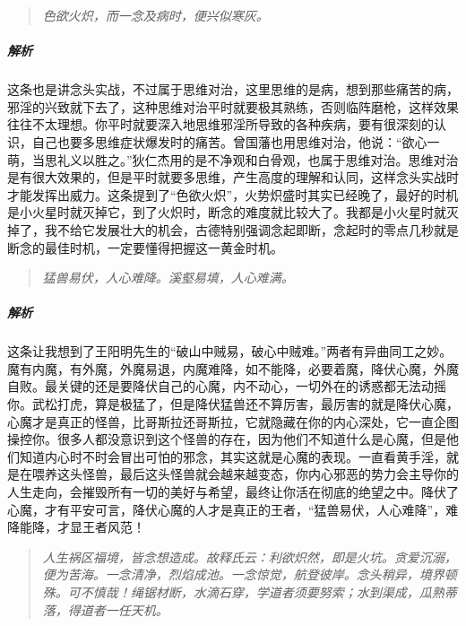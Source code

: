 \begin{quote}\it
    色欲火炽，而一念及病时，便兴似寒灰。
\end{quote}

\subparagraph{解析} 这条也是讲念头实战，不过属于思维对治，这里思维的是病，想到那些痛苦的病，邪淫的兴致就下去了，这种思维对治平时就要极其熟练，否则临阵磨枪，这样效果往往不太理想。你平时就要深入地思维邪淫所导致的各种疾病，要有很深刻的认识，自己也要多思维症状爆发时的痛苦。曾国藩也用思维对治，他说：“欲心一萌，当思礼义以胜之。”狄仁杰用的是不净观和白骨观，也属于思维对治。思维对治是有很大效果的，但是平时就要多思维，产生高度的理解和认同，这样念头实战时才能发挥出威力。这条提到了“色欲火炽”，火势炽盛时其实已经晚了，最好的时机是小火星时就灭掉它，到了火炽时，断念的难度就比较大了。我都是小火星时就灭掉了，我不给它发展壮大的机会，古德特别强调念起即断，念起时的零点几秒就是断念的最佳时机，一定要懂得把握这一黄金时机。

\begin{quote}\it
    猛兽易伏，人心难降。溪壑易填，人心难满。
\end{quote}

\subparagraph{解析} 这条让我想到了王阳明先生的“破山中贼易，破心中贼难。”两者有异曲同工之妙。魔有内魔，有外魔，外魔易退，内魔难降，如不能降，必要着魔，降伏心魔，外魔自败。最关键的还是要降伏自己的心魔，内不动心，一切外在的诱惑都无法动摇你。武松打虎，算是极猛了，但是降伏猛兽还不算厉害，最厉害的就是降伏心魔，心魔才是真正的怪兽，比哥斯拉还哥斯拉，它就隐藏在你的内心深处，它一直企图操控你。很多人都没意识到这个怪兽的存在，因为他们不知道什么是心魔，但是他们知道内心时不时会冒出可怕的邪念，其实这就是心魔的表现。一直看黄手淫，就是在喂养这头怪兽，最后这头怪兽就会越来越变态，你内心邪恶的势力会主导你的人生走向，会摧毁所有一切的美好与希望，最终让你活在彻底的绝望之中。降伏了心魔，才有平安可言，降伏心魔的人才是真正的王者，“猛兽易伏，人心难降”，难降能降，才显王者风范！

\begin{quote}\it
    人生祸区福境，皆念想造成。故释氏云：利欲炽然，即是火坑。贪爱沉溺，便为苦海。一念清净，烈焰成池。一念惊觉，航登彼岸。念头稍异，境界顿殊。可不慎哉！绳锯材断，水滴石穿，学道者须要努索；水到渠成，瓜熟蒂落，得道者一任天机。
\end{quote}

